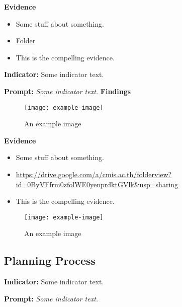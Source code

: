 \documentclass{report}
\begin{document}
\noindent\textbf{Evidence}
\vspace{-\topsep}

\begin{itemize}[leftmargin=*]
\setlength{\parskip}{0pt}
\setlength{\itemsep}{0pt plus 1pt}
\item Some stuff about something.
\item \href{https://drive.google.com/a/cmis.ac.th/folderview?id=0ByVFfrm0zfolWE0yenprdktGVlk&usp=sharing}{Folder}
\item This is the compelling evidence.
\end{itemize}

\noindent\textbf{Indicator:} Some indicator text.

\noindent\textbf{Prompt:} \textit{Some indicator text.}
\noindent\textbf{Findings}

\blindtext

\blinditemize[6]

\blindtext

\begin{figure}[h!]
\caption[An example image]{An example image}
\centering
\texttt{[image: example-image]}
\end{figure}


\noindent\textbf{Evidence}
\vspace{-\topsep}

\begin{itemize}[leftmargin=*]
\setlength{\parskip}{0pt}
\setlength{\itemsep}{0pt plus 1pt}
\item Some stuff about something.
\item \url{https://drive.google.com/a/cmis.ac.th/folderview?id=0ByVFfrm0zfolWE0yenprdktGVlk&usp=sharing}
\item This is the compelling evidence.
\end{itemize}

\begin{figure}[h!]
\caption[An example image]{An example image}
\centering
\texttt{[image: example-image]}
\end{figure}


\subsection{Planning Process}
\blindtext

\blindtext
 
\noindent\textbf{Indicator:} Some indicator text.

\noindent\textbf{Prompt:} \textit{Some indicator text.}
\end{document}
